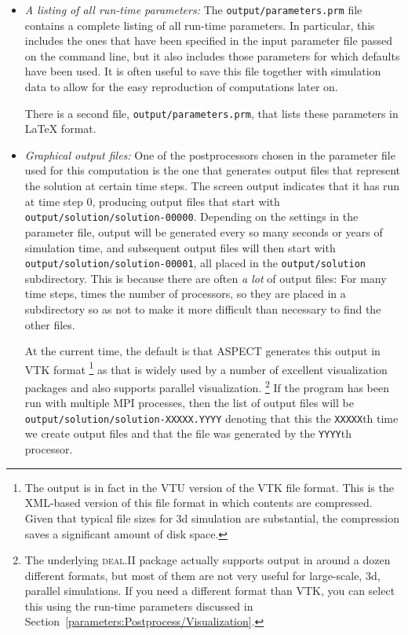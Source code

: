 \documentclass{article}
\newcommand{\dealii}{{\textsc{deal.II}}}
\newcommand{\aspect}{\textsc{ASPECT}}
\begin{document}
\begin{itemize}
\item \textit{A listing of all run-time parameters:} The
  \texttt{output/parameters.prm} file contains a complete listing of all
  run-time parameters. In particular, this includes the ones that have been
  specified in the input parameter file passed on the command line, but it
  also includes those parameters for which defaults have been used. It is
  often useful to save this file together with simulation data to allow for
  the easy reproduction of computations later on.
  
  There is a second file, \texttt{output/parameters.prm}, that lists these
  parameters in \LaTeX{} format.

\item \textit{Graphical output files:} One of the postprocessors chosen
  in the parameter file used for this computation is the one that generates
  output files that represent the solution at certain time steps. The screen output
  indicates that it has run at time step 0, producing output files that start
  with \texttt{output/solution/solution-00000}. Depending on the settings in the
  parameter file, output will be generated every so many seconds or years of
  simulation time, and subsequent output files will then start with
  \texttt{output/solution/solution-00001}, all placed in the
  \texttt{output/solution} subdirectory. This is because there are often
  \textit{a lot} of output files: For many time steps, times the number of
  processors, so they are placed in a subdirectory so as not to make it more
  difficult than necessary to find the other files.
  
  At the current time, the
  default is that \aspect{} generates this output in VTK format%
  \footnote{The output is in fact in the VTU version of the VTK file
    format. This is the XML-based version of this file format in which
    contents are compressed. Given that typical file sizes for 3d simulation
    are substantial, the compression saves a significant amount of disk
    space.}  as that is widely used by a number of excellent visualization
  packages and also supports parallel visualization.%
  \footnote{The underlying \dealii{} package actually supports output in
    around a dozen different formats, but most of them are not very useful for
    large-scale, 3d, parallel simulations. If you need a different format than
    VTK, you can select this using the run-time parameters discussed in
    Section~\ref{parameters:Postprocess/Visualization}.}  If
  the program has been run with multiple MPI processes, then the list of
  output files will be \texttt{output/solution/solution-XXXXX.YYYY}
  denoting that this the \texttt{XXXXX}th time we create output files and that
  the file was generated by the \texttt{YYYY}th processor.


\end{itemize}
\end{document}
